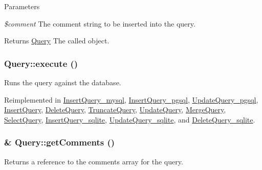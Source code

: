 \begin{DoxyParams}{Parameters}
\item[{\em \$comment}]The comment string to be inserted into the query.\end{DoxyParams}
\begin{DoxyReturn}{Returns}
\hyperlink{classQuery}{Query} The called object. 
\end{DoxyReturn}
\hypertarget{classQuery_a9f2326187a94f3337a7838687b1e6929}{
\subsubsection[{execute}]{\setlength{\rightskip}{0pt plus 5cm}Query::execute ()}}
\label{classQuery_a9f2326187a94f3337a7838687b1e6929}
Runs the query against the database. 

Reimplemented in \hyperlink{classInsertQuery__mysql_a52483727457029115fc127c562b47502}{InsertQuery\_\-mysql}, \hyperlink{classInsertQuery__pgsql_a554ec18b9f8003d0252fa754ab9217d3}{InsertQuery\_\-pgsql}, \hyperlink{classUpdateQuery__pgsql_a1c8ce7ceb61c265cc8b9cfce4afb7648}{UpdateQuery\_\-pgsql}, \hyperlink{classInsertQuery_a9bcd2f989e2ae0173bd6f58b6ede12fc}{InsertQuery}, \hyperlink{classDeleteQuery_a77b0690ed162255ae8a765fed7db0766}{DeleteQuery}, \hyperlink{classTruncateQuery_acc0ca130114686d1ddf4d3315f720c0e}{TruncateQuery}, \hyperlink{classUpdateQuery_a8a90104d1f7aa75cda332b569fd566b9}{UpdateQuery}, \hyperlink{classMergeQuery_aeea46fdb119752efd2048d66b9fe8de8}{MergeQuery}, \hyperlink{classSelectQuery_a06e4212057c140773970e3c34b0b696d}{SelectQuery}, \hyperlink{classInsertQuery__sqlite_a95e8f7db8b3517715f222bf958e39ab9}{InsertQuery\_\-sqlite}, \hyperlink{classUpdateQuery__sqlite_a7919e3bbb318f3dba23570dbdda80fd6}{UpdateQuery\_\-sqlite}, and \hyperlink{classDeleteQuery__sqlite_adfbc9a2783273c02c450bb0d7ff853a8}{DeleteQuery\_\-sqlite}.\hypertarget{classQuery_a263e8b3192c41971060533b78dcf3a4d}{
\subsubsection[{getComments}]{\setlength{\rightskip}{0pt plus 5cm}\& Query::getComments ()}}
\label{classQuery_a263e8b3192c41971060533b78dcf3a4d}
Returns a reference to the comments array for the query.

